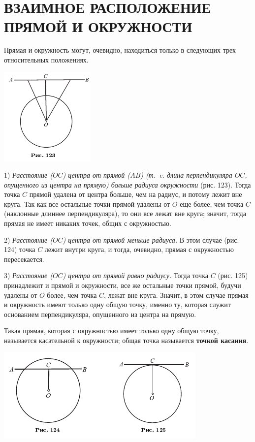 \documentclass[oneside]{book}
\begin{document}
\section{ВЗАИМНОЕ РАСПОЛОЖЕНИЕ ПРЯМОЙ И ОКРУЖНОСТИ}

Прямая и окружность могут, очевидно, находиться только в следующих трех относительных положениях.

\includegraphics{pics/ris-123}

1) \emph{Расстояние \emph{($OC$)} центра от прямой \emph{($AB$) (т.~e.
длина перпендикуляра $OC$, опущенного из центра на прямую)} больше радиуса окружности} (рис. 123).
Тогда точка $C$ прямой удалена от центра больше, чем на радиус, и потому лежит вне круга.
Так как все остальные точки прямой удалены от $O$ еще более, чем точка $C$ (наклонные длиннее перпендикуляра), то они все лежат вне круга; значит, тогда прямая не имеет никаких точек, общих с окружностью.

2) \emph{Расстояние \emph{($OC$)} центра от прямой меньше радиуса.}
В этом случае (рис. 124) точка $C$ лежит внутри круга, и тогда, очевидно, прямая с окружностью пересекается.

3) \emph{Расстояние \emph{($OC$)} центра от прямой равно радиусу.}
Тогда точка $C$ (рис. 125) принадлежит и прямой и окружности, все же остальные точки прямой, будучи удалены от $O$ более, чем точка $C$, лежат вне круга.
Значит, в этом случае прямая и окружность имеют только одну общую точку, именно ту, которая служит основанием перпендикуляра, опущенного из центра на прямую.

Такая прямая, которая с окружностью имеет только одну общую точку, называется касательной к окружности;
общая точка называется \textbf{точкой касания}.

\includegraphics{pics/ris-124-125}
\end{document}
